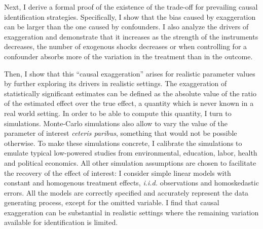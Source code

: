 			Next, I derive a formal proof of the existence of the trade-off for prevailing causal identification strategies. Specifically, I show that the bias caused by exaggeration can be larger than the one caused by confounders. I also analyze the drivers of exaggeration and demonstrate that it increases as the strength of the instruments decreases, the number of exogenous shocks decreases or when controlling for a confounder absorbs more of the variation in the treatment than in the outcome. 
			
			 Then, I show that this ``causal exaggeration'' arises for realistic parameter values by further exploring its drivers in realistic settings.
			The exaggeration of statistically significant estimates can be defined as the absolute value of the ratio of the estimated effect over the true effect, a quantity which is never known in a real world setting. In order to be able to compute this quantity, I turn to simulations. Monte-Carlo simulations also allow to vary the value of the parameter of interest \textit{ceteris paribus}, something that would not be possible otherwise. To make these simulations concrete, I calibrate the simulations to emulate typical  low-powered studies from environmental, education, labor, health and political economics. All other simulation assumptions are chosen to facilitate the recovery of the effect of interest: I consider simple linear models with constant and homogenous treatment effects, \textit{i.i.d.} observations and homoskedastic errors. All the models are correctly specified and accurately represent the data generating process, except for the omitted variable. I find that causal exaggeration can be substantial in realistic settings where the remaining variation available for identification is limited. 
									
